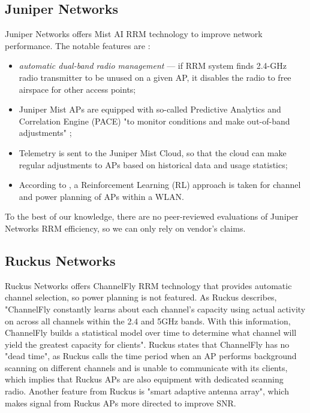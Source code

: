 \subsection{Juniper Networks}
Juniper Networks offers Mist AI RRM technology to improve network performance. The notable features are \cite{junipernetworksUnderstandingRadioResource2023,RadioManagementTechnology}:
\begin{itemize}
    \item \textit{automatic dual-band radio management} — if RRM system finds 2.4-GHz radio transmitter to be unused on a given AP, it disables the radio to free airspace for other access points;
    \item Juniper Mist APs are equipped with so-called Predictive Analytics and Correlation Engine (PACE) "to monitor conditions and make out-of-band adjustments" \cite{RadioManagementTechnology};
    \item Telemetry is sent to the Juniper Mist Cloud, so that the cloud can make regular adjustments to APs based on historical data and usage statistics;
    \item According to \cite{junipernetworksUnderstandingRadioResource2023}, a Reinforcement Learning (RL) approach is taken for channel and power planning of APs within a WLAN.
\end{itemize}
To the best of our knowledge, there are no peer-reviewed evaluations of Juniper Networks RRM efficiency, so we can only rely on vendor's claims.

\subsection{Ruckus Networks}
Ruckus Networks offers \cite{RuckusChannelFlyFeature2023} ChannelFly RRM technology that provides automatic channel selection, so power planning is not featured. As Ruckus describes, "ChannelFly constantly learns about each channel's capacity using actual activity on across all channels within the 2.4 and 5GHz bands. With this information, ChannelFly builds a statistical model over time to determine what channel will yield the greatest capacity for clients". Ruckus states that ChannelFly has no "dead time", as Ruckus calls the time period when an AP performs background scanning on different channels and is unable to communicate with its clients, which implies that Ruckus APs are also equipment with dedicated scanning radio.
Another feature from Ruckus is "smart adaptive antenna array", which makes signal from Ruckus APs more directed to improve SNR.

